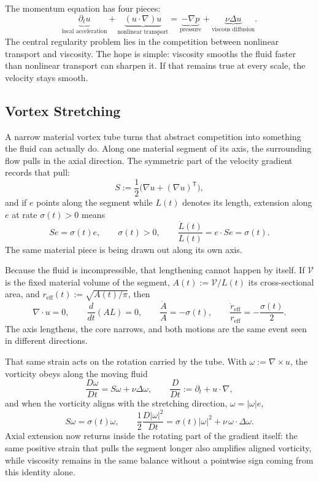 
The momentum equation has four pieces:
\[
  \underbrace{\partial_t u}_{\text{local acceleration}}
  +
  \underbrace{(u\cdot\nabla)u}_{\text{nonlinear transport}}
  =
  \underbrace{-\nabla p}_{\text{pressure}}
  +
  \underbrace{\nu\Delta u}_{\text{viscous diffusion}}.
\]
The central regularity problem lies in the competition between nonlinear transport and viscosity.
The hope is simple: viscosity smooths the fluid faster than nonlinear transport can sharpen it.
If that remains true at every scale, the velocity stays smooth.

\subsection{Vortex Stretching}\label{sub:ThePerfectlyStretchingVortex}

A narrow material vortex tube turns that abstract competition into something the fluid can actually do. Along one material segment of its axis, the surrounding flow pulls in the axial direction. The symmetric part of the velocity gradient records that pull:
\[
  S:=\frac12\bigl(\nabla u+(\nabla u)^{\mathsf T}\bigr),
\]
and if \(e\) points along the segment while \(L(t)\) denotes its length, extension along \(e\) at rate \(\sigma(t)>0\) means
\[
  Se=\sigma(t)e,
  \qquad
  \sigma(t)>0,
  \qquad
  \frac{\dot L(t)}{L(t)}
  =
  e\cdot Se
  =
  \sigma(t).
\]
The same material piece is being drawn out along its own axis.

Because the fluid is incompressible, that lengthening cannot happen by itself. If \(\mathcal V\) is the fixed material volume of the segment, \(A(t):=\mathcal V/L(t)\) its cross-sectional area, and \(r_{\mathrm{eff}}(t):=\sqrt{A(t)/\pi}\), then
\[
  \nabla\cdot u=0,
  \qquad
  \frac{d}{dt}(A L)=0,
  \qquad
  \frac{\dot A}{A}=-\sigma(t),
  \qquad
  \frac{\dot r_{\mathrm{eff}}}{r_{\mathrm{eff}}}
  =
  -\frac{\sigma(t)}{2}.
\]
The axis lengthens, the core narrows, and both motions are the same event seen in different directions.

That same strain acts on the rotation carried by the tube. With \(\omega:=\nabla\times u\), the vorticity obeys along the moving fluid
\[
  \frac{D\omega}{Dt}
  =
  S\omega+\nu\Delta\omega,
  \qquad
  \frac{D}{Dt}
  :=
  \partial_t+u\cdot\nabla,
\]
and when the vorticity aligns with the stretching direction, \(\omega=|\omega|e\),
\[
  S\omega
  =
  \sigma(t)\omega,
  \qquad
  \frac12\frac{D|\omega|^2}{Dt}
  =
  \sigma(t)|\omega|^2
  +
  \nu\,\omega\cdot\Delta\omega.
\]
Axial extension now returns inside the rotating part of the gradient itself: the same positive strain that pulls the segment longer also amplifies aligned vorticity, while viscosity remains in the same balance without a pointwise sign coming from this identity alone.


